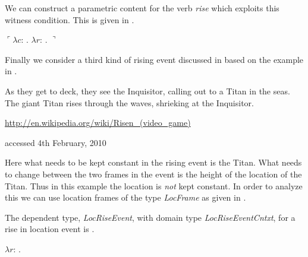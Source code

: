 We can construct a parametric content for the verb \textit{rise} which
exploits this witness condition.  This is given in \nexteg{}.
\begin{ex} 
  $\ulcorner\lambda c$: .
  $\lambda r$: . $\urcorner$
\end{ex} 

Finally we consider a third kind of rising event discussed in
\cite{Cooper2012} based on the example in \nexteg{}.
\begin{ex} 
As they get to deck, they see the Inquisitor, calling out to a Titan
in the seas. The giant Titan rises through the waves, shrieking at the
Inquisitor.

\medskip

\hfill {\footnotesize
  \url{http://en.wikipedia.org/wiki/Risen_(video_game)}}

\hfill {\footnotesize accessed 4th February, 2010} 
\end{ex}   
Here what needs to be kept constant in the rising event is the Titan.
What needs to change between the two frames in the event is the height
of the location of the Titan.  Thus in this example the
location is \textit{not} kept constant. In order to analyze this we
can use location frames of the type \textit{LocFrame} as given in
\nexteg{}.
\begin{ex} 
\end{ex} 
The dependent type, \textit{LocRiseEvent}, with domain type \textit{LocRiseEventCntxt}, for a rise in location event is \nexteg{}.
\begin{ex} 
$\lambda
r$: .\\  
\hspace*{2em}  
\end{ex} 
